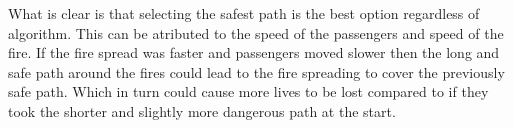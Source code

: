 What is clear is that selecting the safest path is the best option regardless of algorithm. This can be atributed to the speed of the passengers and speed of the fire. If the fire spread was faster and passengers moved slower then the long and safe path around the fires could lead to the fire spreading to cover the previously safe path. Which in turn could cause more lives to be lost compared to if they took the shorter and slightly more dangerous path at the start.





